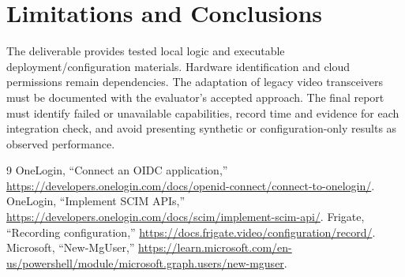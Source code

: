 \documentclass[conference]{IEEEtran}
\begin{document}
\section{Limitations and Conclusions}
The deliverable provides tested local logic and executable deployment/configuration materials. Hardware identification and cloud permissions remain dependencies. The adaptation of legacy video transceivers must be documented with the evaluator's accepted approach. The final report must identify failed or unavailable capabilities, record time and evidence for each integration check, and avoid presenting synthetic or configuration-only results as observed performance.

\begin{thebibliography}{9}
 OneLogin, ``Connect an OIDC application,'' \url{https://developers.onelogin.com/docs/openid-connect/connect-to-onelogin/}.
 OneLogin, ``Implement SCIM APIs,'' \url{https://developers.onelogin.com/docs/scim/implement-scim-api/}.
 Frigate, ``Recording configuration,'' \url{https://docs.frigate.video/configuration/record/}.
 Microsoft, ``New-MgUser,'' \url{https://learn.microsoft.com/en-us/powershell/module/microsoft.graph.users/new-mguser}.
\end{thebibliography}
\end{document}
